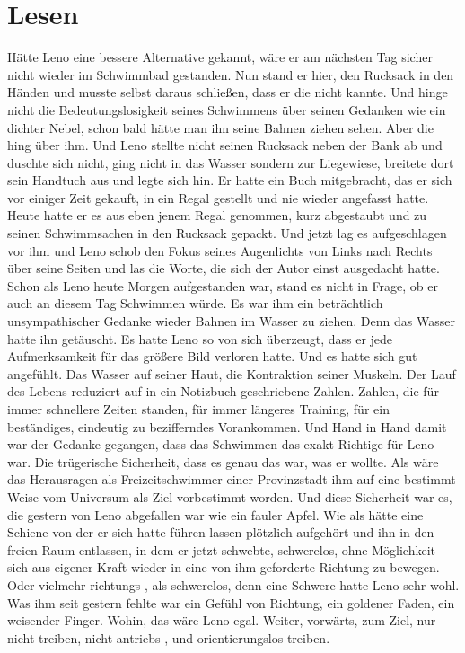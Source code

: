 \documentclass[ngerman,smalldemyvopaper,11pt,oneside,onecolumn,openright,extrafontsizes]{memoir}
\begin{document}
\chapter{Lesen}
Hätte Leno eine bessere Alternative gekannt, wäre er am nächsten Tag sicher nicht wieder im Schwimmbad gestanden. Nun stand er hier, den Rucksack in den Händen und musste selbst daraus schließen, dass er die nicht kannte. Und hinge nicht die Bedeutungslosigkeit seines Schwimmens über seinen Gedanken wie ein dichter Nebel, schon bald hätte man ihn seine Bahnen ziehen sehen. Aber die hing über ihm. Und Leno stellte nicht seinen Rucksack neben der Bank ab und duschte sich nicht, ging nicht in das Wasser sondern zur Liegewiese, breitete dort sein Handtuch aus und legte sich hin. Er hatte ein Buch mitgebracht, das er sich vor einiger Zeit gekauft, in ein Regal gestellt und nie wieder angefasst hatte. Heute hatte er es aus eben jenem Regal genommen, kurz abgestaubt und zu seinen Schwimmsachen in den Rucksack gepackt. Und jetzt lag es aufgeschlagen vor ihm und Leno schob den Fokus seines Augenlichts von Links nach Rechts über seine Seiten und las die Worte, die sich der Autor einst ausgedacht hatte.\\
Schon als Leno heute Morgen aufgestanden war, stand es nicht in Frage, ob er auch an diesem Tag Schwimmen würde. Es war ihm ein beträchtlich unsympathischer Gedanke wieder Bahnen im Wasser zu ziehen. Denn das Wasser hatte ihn getäuscht. Es hatte Leno so von sich überzeugt, dass er jede Aufmerksamkeit für das größere Bild verloren hatte. Und es hatte sich gut angefühlt. Das Wasser auf seiner Haut, die Kontraktion seiner Muskeln. Der Lauf des Lebens reduziert auf in ein Notizbuch geschriebene Zahlen. Zahlen, die für immer schnellere Zeiten standen, für immer längeres Training, für ein beständiges, eindeutig zu bezifferndes Vorankommen. Und Hand in Hand damit war der Gedanke gegangen, dass das Schwimmen das exakt Richtige für Leno war. Die trügerische Sicherheit, dass es genau das war, was er wollte. Als wäre das Herausragen als Freizeitschwimmer einer Provinzstadt ihm auf eine bestimmt Weise vom Universum als Ziel vorbestimmt worden. Und diese Sicherheit war es, die gestern von Leno abgefallen war wie ein fauler Apfel. Wie als hätte eine Schiene von der er sich hatte führen lassen plötzlich aufgehört und ihn in den freien Raum entlassen, in dem er jetzt schwebte, schwerelos, ohne Möglichkeit sich aus eigener Kraft wieder in eine von ihm geforderte Richtung zu bewegen. Oder vielmehr richtungs-, als schwerelos, denn eine Schwere hatte Leno sehr wohl. Was ihm seit gestern fehlte war ein Gefühl von Richtung, ein goldener Faden, ein weisender Finger. Wohin, das wäre Leno egal. Weiter, vorwärts, zum Ziel, nur nicht treiben, nicht antriebs-, und orientierungslos treiben.\\
\end{document}
